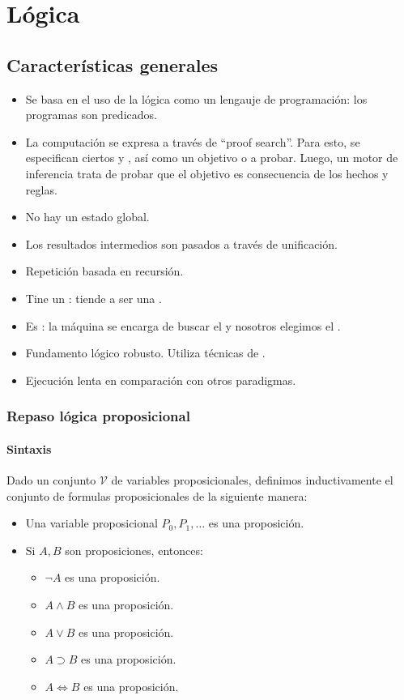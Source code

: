 \section{Lógica}

\subsection{Características generales}

\begin{itemize}
  \item Se basa en el uso de la lógica como un lengauje de programación: los programas son predicados.
  \item La computación se expresa a través de ``proof search''. Para esto, se especifican ciertos  y , así como un objetivo o  a probar. Luego, un motor de inferencia trata de probar que el objetivo es consecuencia de los hechos y reglas.
  \item No hay un estado global.
  \item Los resultados intermedios son pasados a través de unificación.
  \item Repetición basada en recursión.
  \item Tine un : tiende a ser una .
  \item Es : la máquina se encarga de buscar el  y nosotros elegimos el .
  \item Fundamento lógico robusto. Utiliza técnicas de .
  \item Ejecución lenta en comparación con otros paradigmas.
\end{itemize}

\subsubsection{Repaso lógica proposicional}

\paragraph{Sintaxis}

Dado un conjunto $\mathcal{V}$ de variables proposicionales, definimos inductivamente el conjunto de formulas proposicionales de la siguiente manera:

\begin{itemize}
  \item Una variable proposicional $P_0, P_1, \dots$ es una proposición.
  \item Si $A, B$ son proposiciones, entonces:
    \begin{itemize}
      \item $\lnot A$ es una proposición.
      \item $A \land B$ es una proposición.
      \item $A \lor B$ es una proposición.
      \item $A \supset B$ es una proposición.
      \item $A \iff B$ es una proposición.
    \end{itemize}
\end{itemize}


